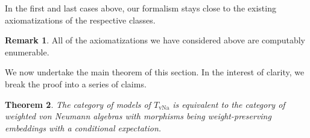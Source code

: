 \documentclass[12pt]{amsart}
\newtheorem{thm}{Theorem}[section]
\theoremstyle{definition}
\newtheorem{remark}[thm]{Remark}
\DeclareMathOperator{\vNa}{vNa}
\begin{document}
In the first and last cases above, our formalism stays close to the existing axiomatizations of the respective classes.

\begin{remark}
    All of the axiomatizations we have considered above are computably enumerable.
\end{remark}

We now undertake the main theorem of this section.  In the interest of clarity, we break the proof into a series of claims.

\begin{thm}\label{correctness}
    The category of models of $T_{\vNa}$ is equivalent to the category of weighted von Neumann algebras with morphisms being weight-preserving embeddings with a conditional expectation.
\end{thm}
\end{document}
